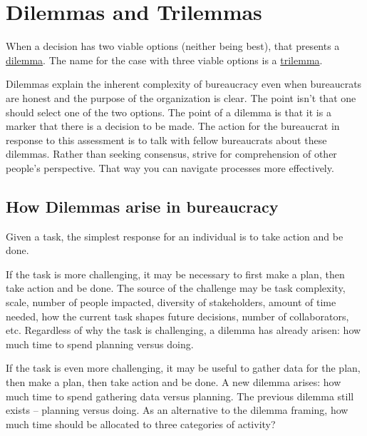 \section{Dilemmas and Trilemmas\label{sec:dilemma_trilemma}}




When a decision has two viable options (neither being best), that presents a \href{https://en.wikipedia.org/wiki/Dilemma}{dilemma}. The name for the case with three viable options is a \href{https://en.wikipedia.org/wiki/Trilemma}{trilemma}. 

Dilemmas explain the inherent complexity of bureaucracy even when bureaucrats are honest and the purpose of the organization is clear.
The point isn't that one should select one of the two options. The point of a dilemma is that it is a marker that there is a decision to be made.
The action for the bureaucrat in response to this assessment is to talk with fellow bureaucrats about these dilemmas. Rather than seeking consensus, strive for comprehension of other people's perspective. That way you can navigate processes more effectively.

\subsection{How Dilemmas arise in bureaucracy}

Given a task, the simplest response for an individual is to take action and be done. 

If the task is more challenging, it may be necessary to first make a plan, then take action and be done. The source of the challenge may be task complexity, scale, number of people impacted, diversity of stakeholders, amount of time needed, how the current task shapes future decisions, number of collaborators, etc. Regardless of why the task is challenging, a dilemma has already arisen: how much time to spend planning versus doing. 

If the task is even more challenging, it may be useful to gather data for the plan, then make a plan, then take action and be done. A new dilemma arises: how much time to spend gathering data versus planning. The previous dilemma still exists -- planning versus doing. As an alternative to the dilemma framing, how much time should be allocated to three categories of activity?

